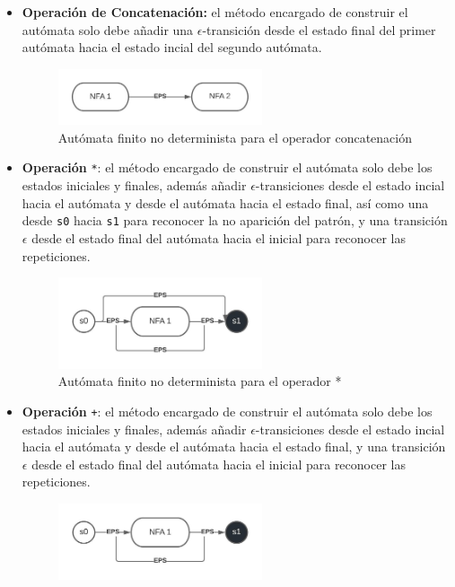 \begin{itemize}
\begin{figure}
                \end{figure}
        \item \textbf{Operación de Concatenación:} el método encargado de construir el autómata solo debe  añadir una $\epsilon$-transición desde el estado final del primer autómata hacia el estado incial del segundo autómata.
                \begin{figure}
                        \centering
                        \includegraphics[width=6cm]{./chapters/img/concat.jpeg}
                        \caption{Autómata finito no determinista para el operador concatenación}
                \end{figure}
        \item \textbf{Operación} \verb|*|: el método encargado de construir el autómata solo debe los estados iniciales y finales, además añadir $\epsilon$-transiciones desde el estado incial hacia el autómata y desde el autómata hacia el estado final, así como una desde \verb|s0| hacia \verb|s1| para reconocer la no aparición del patrón, y una transición $\epsilon$ desde el estado final del autómata hacia el inicial para reconocer las repeticiones.
                \begin{figure}
                        \centering
                        \includegraphics[width=6cm]{./chapters/img/star.jpeg}
                        \caption{Autómata finito no determinista para el operador *}
                \end{figure}
        \item \textbf{Operación} \verb|+|: el método encargado de construir el autómata solo debe los estados iniciales y finales, además añadir $\epsilon$-transiciones desde el estado incial hacia el autómata y desde el autómata hacia el estado final, y una transición $\epsilon$ desde el estado final del autómata hacia el inicial para reconocer las repeticiones.
                \begin{figure}
                        \centering
                        \includegraphics[width=6cm]{./chapters/img/plus.jpeg}

\end{figure}
\end{itemize}
